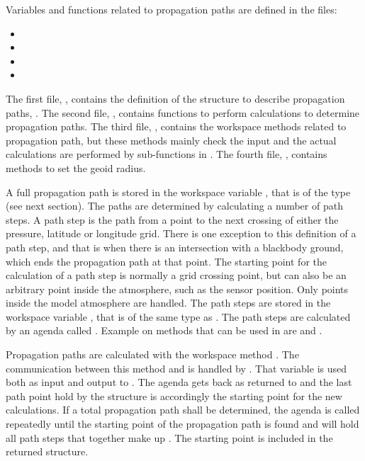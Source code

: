 Variables and functions related to propagation paths are defined in the files:
\begin{itemize}
\item {}
\item {}
\item {}
\item {}
\end{itemize}
The first file, , contains the definition of the
structure to describe propagation paths, . The
second file, , contains functions to perform
calculations to determine propagation paths. The third file,
, contains the workspace methods related to
propagation path, but these methods mainly check the input and the
actual calculations are performed by sub-functions in
. The fourth file, ,
contains methods to set the geoid radius.




\label{sec:ppath:approach}

A full propagation path is stored in the workspace variable
, that is of the type  (see next
section). The paths are determined by calculating a number of path
steps. A path step is the path from a point to the next crossing
of either the pressure, latitude or longitude grid. There is one
exception to this definition of a path step, and that is when there
is an intersection with a blackbody ground, which ends the propagation
path at that point. The starting point for the calculation of a path
step is normally a grid crossing point, but can also be an arbitrary
point inside the atmosphere, such as the sensor position. Only points
inside the model atmosphere are handled. The path steps are stored in
the workspace variable , that is of the same
type as . The path steps are calculated by an agenda
called . Example on methods that can
be used in  are
 and
.

Propagation paths are calculated with the workspace method
. The communication between this method and
 is handled by .
That variable is used both as input and output to
.  The agenda gets back
 as returned to  and the
last path point hold by the structure is accordingly the starting
point for the new calculations. If a total propagation path shall be
determined, the agenda is called repeatedly until the starting point
of the propagation path is found and  will hold
all path steps that together make up . The starting
point is included in the returned structure.

